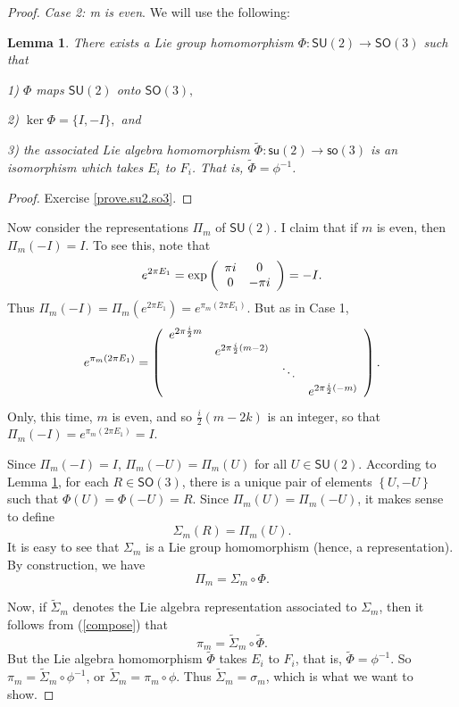 \documentclass{amsbook}
\theoremstyle{plain}
\newtheorem{lemma}[theorem]{Lemma}
\numberwithin{equation}{chapter}
\numberwithin{theorem}{chapter}
\begin{document}
\begin{proof}
\textit{Case 2: m is even}. We will use the following:

\begin{lemma}
\label{su2.so3}There exists a Lie group homomorphism $\Phi:\mathsf{SU}%
(2)\rightarrow\mathsf{SO}(3)$ such that

1) $\Phi$ maps $\mathsf{SU}(2)$ onto $\mathsf{SO}(3),$

2) $\ker\Phi=\{I,-I\},$ and

3) the associated Lie algebra homomorphism $\widetilde{\Phi}:\mathsf{su}%
(2)\rightarrow\mathsf{so}(3)$ is an isomorphism which takes $E_{i}$ to $F_{i}%
$. That is, $\widetilde{\Phi}=\phi^{-1}$.
\end{lemma}

\begin{proof}
Exercise \ref{prove.su2.so3}.
\end{proof}

Now consider the representations $\Pi_{m}$ of $\mathsf{SU}(2)$. I claim that
if $m$ is even, then $\Pi_{m}(-I)=I$. To see this, note that
\[
e^{2\pi E_{1}}=\exp\left(
\begin{array}
[c]{cc}%
\pi i & 0\\
0 & -\pi i
\end{array}
\right)  =-I\text{.}%
\]
Thus $\Pi_{m}(-I)=\Pi_{m}(e^{2\pi E_{1}})=e^{\pi_{m}(2\pi E_{1})}$. But as in
Case 1,
\[
e^{\pi_{m}(2\pi E_{1})}=\left(
\begin{array}
[c]{cccc}%
e^{2\pi\frac{i}{2}m} &  &  & \\
& e^{2\pi\frac{i}{2}(m-2)} &  & \\
&  & \ddots & \\
&  &  &  e^{2\pi\frac{i}{2}(-m)}%
\end{array}
\right)  \text{.}%
\]
Only, this time, $m$ is even, and so $\frac{i}{2}(m-2k)$ is an integer, so
that $\Pi_{m}(-I)=e^{\pi_{m}(2\pi E_{1})}=I$.

Since $\Pi_{m}(-I)=I$, $\Pi_{m}(-U)=\Pi_{m}(U)$ for all $U\in\mathsf{SU}(2)$.
According to Lemma \ref{su2.so3}, for each $R\in\mathsf{SO}(3)$, there is a
unique pair of elements $\left\{  U,-U\right\}  $ such that $\Phi
(U)=\Phi(-U)=R$. Since $\Pi_{m}(U)=\Pi_{m}(-U)$, it makes sense to define
\[
\Sigma_{m}(R)=\Pi_{m}(U)\text{.}%
\]
It is easy to see that $\Sigma_{m}$ is a Lie group homomorphism (hence, a
representation). By construction, we have
\begin{equation}
\Pi_{m}=\Sigma_{m}\circ\Phi\text{.}\label{compose}%
\end{equation}

Now, if $\widetilde{\Sigma}_{m}$ denotes the Lie algebra representation
associated to $\Sigma_{m}$, then it follows from (\ref{compose}) that
\[
\pi_{m}=\widetilde{\Sigma}_{m}\circ\widetilde{\Phi}\text{.}%
\]
But the Lie algebra homomorphism $\widetilde{\Phi}$ takes $E_{i}$ to $F_{i}$,
that is, $\widetilde{\Phi}=\phi^{-1}$. So $\pi_{m}=\widetilde{\Sigma}_{m}%
\circ\phi^{-1}$, or $\widetilde{\Sigma}_{m}=\pi_{m}\circ\phi$. Thus
$\widetilde{\Sigma}_{m}=\sigma_{m}$, which is what we want to show.
\end{proof}
\end{document}

